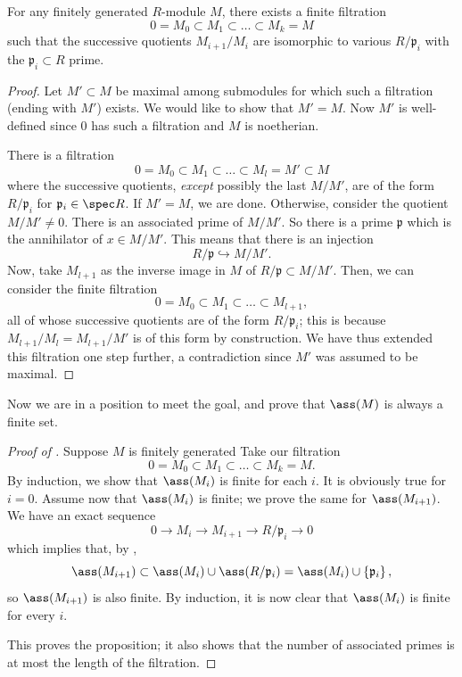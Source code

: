 \begin{proposition}[D{\'e}vissage] \label{filtrationlemma} \label{devissage}
For any finitely generated $R$-module $M$, there exists a finite filtration
\[ 0 = M_0 \subset M_1 \subset \dots \subset M_k = M  \]
such that the successive quotients $M_{i+1}/M_i$ are isomorphic to various
$R/\mathfrak{p}_i$ with the $\mathfrak{p}_i \subset R$ prime.
\end{proposition} 
\begin{proof} 
Let $M' \subset M$ be maximal among submodules for which such a filtration
(ending with $M'$)
exists. We would like to show that $M' = M$.  Now $M'$ is well-defined since
$0$ has such a filtration and $M$ is
noetherian.  

There is a filtration
\[ 0 = M_0 \subset M_1 \subset \dots \subset M_l = M' \subset M  \]
where the successive quotients, \emph{except} possibly the last $M/M'$, are of
the form $R/\mathfrak{p}_i $ for $\mathfrak{p}_i \in \spec R$.
If $M' = M$, we are done. Otherwise, consider
the quotient $M/M' \neq 0$. There is an associated prime of $M/M'$. So there is
a prime $\mathfrak{p}$ which is the annihilator of $x \in M/M'$. This means
that there is an injection 
\[ R/\mathfrak{p} \hookrightarrow M/M'.  \]
Now, take $M_{l+1}$ as the inverse image in $M$
of $R/\mathfrak{p} \subset M/M'$. 
Then, we can consider the finite filtration
\[ 0 = M_0 \subset M_1 \subset \dots \subset M_{l+1} , \]
all of whose successive quotients are of the form $R/\mathfrak{p}_i$; this is
because $M_{l+1}/M_l = M_{l+1}/M'$ is of this form by construction.
We have thus extended this filtration one
step further,  a contradiction since
$M'$ was assumed to be maximal.
\end{proof} 

Now we are in a position to meet the goal, and prove that $\ass(M)$ is
always a finite set. 
\begin{proof}[Proof of ]
Suppose $M$ is finitely generated Take our filtration
\[ 0 = M_0 \subset M_1 \subset \dots \subset M_k = M.  \]
By induction, we show that $\ass(M_i)$ is finite for each $i$. It is obviously
true for $i=0$. Assume now that $\ass(M_i)$ is finite; we prove the same for
$\ass(M_{i+1})$. We have an exact sequence
\[ 0 \to M_i \to M_{i+1} \to R/\mathfrak{p}_i \to 0  \]
which implies that, by ,
\[ \ass(M_{i+1}) \subset \ass(M_i) \cup \ass(R/\mathfrak{p}_i) = \ass(M_i)
\cup \left\{\mathfrak{p}_i\right\} , \]
so $\ass(M_{i+1})$ is also finite.
By induction, it is now clear that $\ass(M_i)$ is finite for every $i$.

This proves the proposition; it also shows that the number of
associated primes is at most the length of the filtration. 
\end{proof} 


